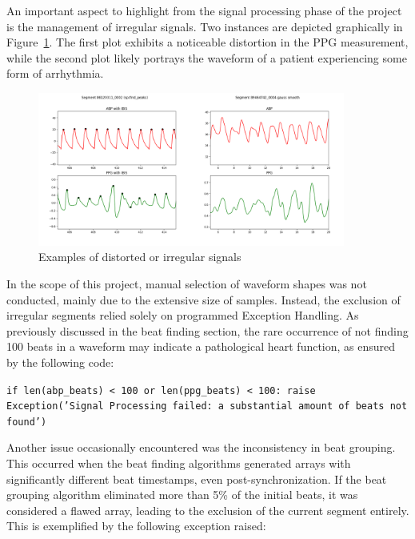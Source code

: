 An important aspect to highlight from the signal processing phase of the project is the management of irregular signals.
Two instances are depicted graphically in Figure~\ref{fig:distorted}.
The first plot exhibits a noticeable distortion in the PPG measurement, while the second plot likely portrays the waveform of a patient experiencing some form of arrhythmia.

\begin{figure}[h]
    \includegraphics[width=0.9\textwidth]{images/methods/cringe_signals}
    \caption{Examples of distorted or irregular signals}
    \label{fig:distorted}
\end{figure}

In the scope of this project, manual selection of waveform shapes was not conducted, mainly due to the extensive size of samples.
Instead, the exclusion of irregular segments relied solely on programmed Exception Handling.
As previously discussed in the beat finding section, the rare occurrence of not finding 100 beats in a waveform may indicate a pathological heart function, as ensured by the following code:

\vspace{0.1cm}
{\texttt{\small if len(abp\_beats) < 100 or len(ppg\_beats) < 100: \newline
\indent\indent\indent raise Exception('Signal Processing failed: \newline
\indent\indent\indent\indent\indent\indent a substantial amount of beats not found')}}
\vspace{0.1cm}

Another issue occasionally encountered was the inconsistency in beat grouping.
This occurred when the beat finding algorithms generated arrays with significantly different beat timestamps, even post-synchronization.
If the beat grouping algorithm eliminated more than 5\% of the initial beats, it was considered a flawed array, leading to the exclusion of the current segment entirely.
This is exemplified by the following exception raised:

